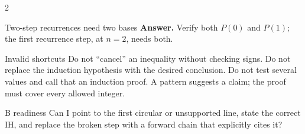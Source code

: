 \documentclass[10pt]{article}
\begin{document}
\begin{multicols}{2}
\begin{workedbox}{Two-step recurrences need two bases}
\textbf{Answer.} Verify both $P(0)$ and $P(1)$; the first recurrence step,
at $n=2$, needs both.
\end{workedbox}

\begin{warningbox}{Invalid shortcuts}
Do not ``cancel'' an inequality without checking signs. Do not replace the
induction hypothesis with the desired conclusion. Do not test several values
and call that an induction proof. A pattern suggests a claim; the proof must
cover every allowed integer.
\end{warningbox}

\begin{checklistbox}{B readiness}
Can I point to the first circular or unsupported line, state the correct IH,
and replace the broken step with a forward chain that explicitly cites it?
\end{checklistbox}
\end{multicols}

\clearpage
\end{document}

